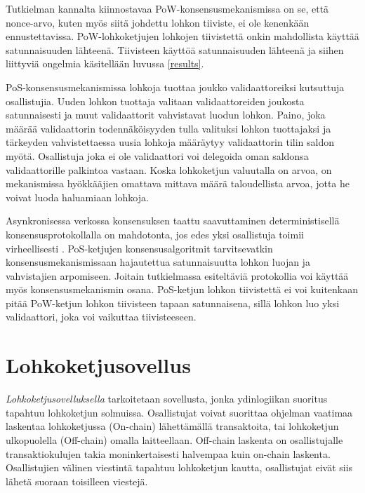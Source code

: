 Tutkielman kannalta kiinnostavaa PoW-konsensusmekanismissa on se, että nonce-arvo, kuten myös siitä johdettu lohkon tiiviste, ei ole kenenkään ennustettavissa. PoW-lohkoketjujen lohkojen tiivistettä onkin mahdollista käyttää satunnaisuuden lähteenä. Tiivisteen käyttöä satunnaisuuden lähteenä ja siihen liittyviä ongelmia käsitellään luvussa \ref{results}.


PoS-konsensusmekanismissa lohkoja tuottaa joukko validaattoreiksi kutsuttuja osallistujia. Uuden lohkon tuottaja valitaan validaattoreiden joukosta satunnaisesti ja muut validaattorit vahvistavat luodun lohkon. Paino, joka määrää validaattorin todennäköisyyden tulla valituksi lohkon tuottajaksi ja tärkeyden vahvistettaessa uusia lohkoja määräytyy validaattorin tilin saldon myötä. Osallistuja joka ei ole validaattori voi delegoida oman saldonsa validaattorille palkintoa vastaan. Koska lohkoketjun valuutalla on arvoa, on mekanismissa hyökkääjien omattava mittava määrä taloudellista arvoa, jotta he voivat luoda haluamiaan lohkoja.

Asynkronisessa verkossa konsensuksen taattu saavuttaminen deterministisellä konsensusprotokollalla on mahdotonta, jos edes yksi osallistuja toimii virheellisesti \cite{fischer_impossibility_1985}. PoS-ketjujen konsensusalgoritmit tarvitsevatkin konsensusmekanismissaan hajautettua satunnaisuutta lohkon luojan ja vahvistajien arpomiseen. Joitain tutkielmassa esiteltäviä protokollia voi käyttää myös konsensusmekanismin osana. PoS-ketjun lohkon tiivistettä ei voi kuitenkaan pitää PoW-ketjun lohkon tiivisteen tapaan satunnaisena, sillä lohkon luo yksi validaattori, joka voi vaikuttaa tiivisteeseen.

\section{Lohkoketjusovellus}

\textit{Lohkoketjusovelluksella} tarkoitetaan sovellusta, jonka ydinlogiikan suoritus tapahtuu lohkoketjun solmuissa. Osallistujat voivat suorittaa ohjelman vaatimaa laskentaa lohkoketjussa (On-chain) lähettämällä transaktoita, tai lohkoketjun ulkopuolella (Off-chain) omalla laitteellaan. Off-chain laskenta on osallistujalle transaktiokulujen takia moninkertaisesti halvempaa kuin on-chain laskenta. Osallistujien välinen viestintä tapahtuu lohkoketjun kautta, osallistujat eivät siis lähetä suoraan toisilleen viestejä.

